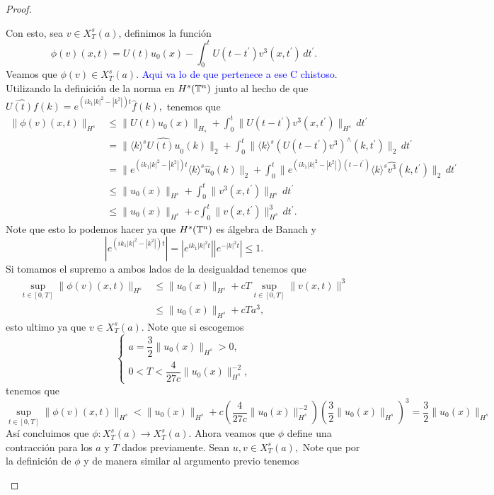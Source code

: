 \begin{proof}
\begin{itemize}
       Con esto, sea $v\in X^s_T(a)$, definimos la función
       $$\phi(v)(x,t)=U(t)u_0(x)-\int_0^tU(t-t^\prime)v^3(x,t^\prime)\,dt^\prime.$$
       Veamos que $\phi(v)\in X^s_T(a).$ \textcolor{blue}{Aqui va lo de que pertenece a ese C chistoso}.
       Utilizando la definición de la norma en $H^s(\mathbb{T}^n)$ junto al hecho de que $\widehat{U(t)f}(k)=e^{(ik_1|k|^2-|k^2|)t}\widehat{f}(k),$ tenemos que
       \begin{align*}
           \|\phi(v)(x,t)\|_{H^s}&\leq\|U(t)u_0(x)\|_{H_s}+\int_0^t\|U(t-t^\prime)v^3(x,t^\prime)\|_{H^s}\,dt^\prime\\
           &=\|\langle k\rangle^s\widehat{U(t)u}_0(k)\|_2+\int_0^t\|\langle k\rangle^s(U(t-t^\prime)v^3)^\wedge(k,t^\prime)\|_2\,dt^\prime\\
           &=\|e^{(ik_1|k|^2-|k^2|)t}\langle k\rangle^s\widehat{u}_0(k)\|_2+\int_0^t\|e^{(ik_1|k|^2-|k^2|)(t-t^\prime)}\langle k\rangle^s\widehat{v^3}(k,t^\prime)\|_2\,dt^\prime\\
           &\leq\|u_0(x)\|_{H^s}+\int_0^t\|v^3(x,t^\prime)\|_{H^s}\,dt^\prime\\
           &\leq\|u_0(x)\|_{H^s}+c\int_0^t\|v(x,t^\prime)\|^3_{H^s}\,dt^\prime.
       \end{align*}
       Note que esto lo podemos hacer ya que $H^s(\mathbb{T}^n)$ es álgebra de Banach y 
       $$\left|e^{(ik_1|k|^2-|k^2|)t}\right|=\left|e^{ik_1|k|^2t}\right|\left|e^{-|k|^2t}\right|\leq 1.$$
       Si tomamos el supremo a ambos lados de la desigualdad tenemos que
       \begin{align*}
           \sup_{t\in[0,T]}\|\phi(v)(x,t)\|_{H^s}&\leq\|u_0(x)\|_{H^s}+cT\sup_{t\in[0,T]}\|v(x,t)\|^3\\
           &\leq\|u_0(x)\|_{H^s}+cTa^3,
       \end{align*}
       esto ultimo ya que $v\in X_T^s(a).$ Note que si escogemos
       $$\begin{cases}
           a=\dfrac{3}{2}\|u_0(x)\|_{H^s}>0,\\
           0<T<\dfrac{4}{27c}\|u_0(x)\|^{-2}_{H^s},
       \end{cases}$$
       tenemos que
       $$\sup_{t\in[0,T]}\|\phi(v)(x,t)\|_{H^s}<\|u_0(x)\|_{H^s}+c\left(\dfrac{4}{27c}\|u_0(x)\|^{-2}_{H^s}\right)\left(\dfrac{3}{2}\|u_0(x)\|_{H^s}\right)^3 =\dfrac{3}{2}\|u_0(x)\|_{H^s}$$
       Así concluimos que $\phi:X^s_T(a)\to X^s_T(a).$ Ahora veamos que $\phi$ define una contracción para los $a$ y $T$ dados previamente. Sean $u,v\in X^s_T(a),$ Note que por la definición de $\phi$ y de manera similar al argumento previo tenemos

\end{itemize}
\end{proof}

